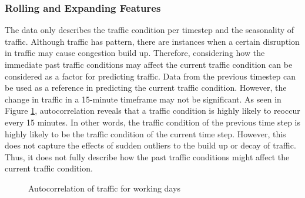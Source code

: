 
\subsubsection{Rolling and Expanding Features}

The data only describes the traffic condition per timestep and the seasonality of traffic. Although traffic has pattern, there are instances when a certain disruption in traffic may cause congestion build up. Therefore, considering how the immediate past traffic conditions may affect the current traffic condition can be considered as a factor for predicting traffic. Data  from the previous timestep can be used as a reference in predicting the current traffic condition. However, the change in traffic in a 15-minute timeframe may not be significant. As seen in Figure \ref{autocorr_whyRE}, autocorrelation reveals that a traffic condition is highly likely to reoccur every 15 minutes. In other words, the traffic condition of the previous time step is highly likely to be the traffic condition of the current time step. However, this does not capture the effects of sudden outliers to the build up or decay of traffic. Thus, it does not fully describe how the past traffic conditions might affect the current traffic condition. 


\begin{figure}[h] 
\centering
  \centering
  \caption{Autocorrelation of traffic for working days}
  \label{autocorr_whyRE}
\end{figure}



